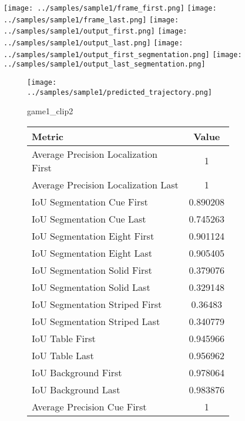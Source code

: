 \begin{figure}
    \texttt{[image: ../samples/sample1/frame\_first.png]}
    \texttt{[image: ../samples/sample1/frame\_last.png]}
    \newline
    \texttt{[image: ../samples/sample1/output\_first.png]}
    \texttt{[image: ../samples/sample1/output\_last.png]}
    \newline
    \texttt{[image: ../samples/sample1/output\_first\_segmentation.png]}
    \texttt{[image: ../samples/sample1/output\_last\_segmentation.png]}
    \newline
    \begin{subfigure}[b]{0.49\textwidth}
        \vspace{20pt}
        \texttt{[image: ../samples/sample1/predicted\_trajectory.png]}
        \caption*{game1\_clip2}
    \end{subfigure}
\begin{subfigure}[b]{0.49\textwidth}
    \begin{tabular}{|l|c|}
        \hline
        \textbf{Metric} & \textbf{Value} \\
        \hline
        Average Precision Localization First & 1 \\
        Average Precision Localization Last & 1 \\
        \hline
        IoU Segmentation Cue First & 0.890208 \\
        IoU Segmentation Cue Last & 0.745263 \\
        IoU Segmentation Eight First & 0.901124 \\
        IoU Segmentation Eight Last & 0.905405 \\
        IoU Segmentation Solid First & 0.379076 \\
        IoU Segmentation Solid Last & 0.329148 \\
        IoU Segmentation Striped First & 0.36483 \\
        IoU Segmentation Striped Last & 0.340779 \\
        \hline
        IoU Table First & 0.945966 \\
        IoU Table Last & 0.956962 \\
        IoU Background First & 0.978064 \\
        IoU Background Last & 0.983876 \\
        \hline
        Average Precision Cue First & 1 \\

\end{tabular}
\end{subfigure}
\end{figure}
